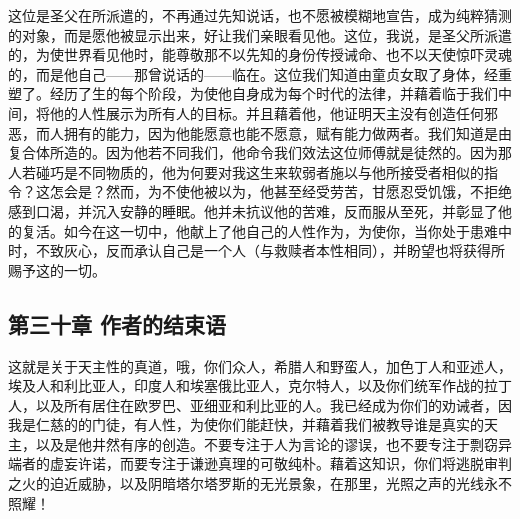 这位是圣父在所派遣的，不再通过先知说话，也不愿被模糊地宣告，成为纯粹猜测的对象，而是愿他被显示出来，好让我们亲眼看见他。这位，我说，是圣父所派遣的，为使世界看见他时，能尊敬那不以先知的身份传授诫命、也不以天使惊吓灵魂的，而是他自己——那曾说话的——临在。这位我们知道由童贞女取了身体，经重塑了。经历了生的每个阶段，为使他自身成为每个时代的法律，并藉着临于我们中间，将他的人性展示为所有人的目标。并且藉着他，他证明天主没有创造任何邪恶，而人拥有的能力，因为他能愿意也能不愿意，赋有能力做两者。我们知道是由复合体所造的。因为他若不同我们，他命令我们效法这位师傅就是徒然的。因为那人若碰巧是不同物质的，他为何要对我这生来软弱者施以与他所接受者相似的指令？这怎会是？然而，为不使他被以为，他甚至经受劳苦，甘愿忍受饥饿，不拒绝感到口渴，并沉入安静的睡眠。他并未抗议他的苦难，反而服从至死，并彰显了他的复活。如今在这一切中，他献上了他自己的人性作为，为使你，当你处于患难中时，不致灰心，反而承认自己是一个人（与救赎者本性相同），并盼望也将获得所赐予这的一切。\par


\subsection{第三十章 作者的结束语}

这就是关于天主性的真道，哦，你们众人，希腊人和野蛮人，加色丁人和亚述人，埃及人和利比亚人，印度人和埃塞俄比亚人，克尔特人，以及你们统军作战的拉丁人，以及所有居住在欧罗巴、亚细亚和利比亚的人。我已经成为你们的劝诫者，因我是仁慈的的门徒，有人性，为使你们能赶快，并藉着我们被教导谁是真实的天主，以及是他井然有序的创造。不要专注于人为言论的谬误，也不要专注于剽窃异端者的虚妄许诺，而要专注于谦逊真理的可敬纯朴。藉着这知识，你们将逃脱审判之火的迫近威胁，以及阴暗塔尔塔罗斯的无光景象，在那里，光照之声的光线永不照耀！\par

